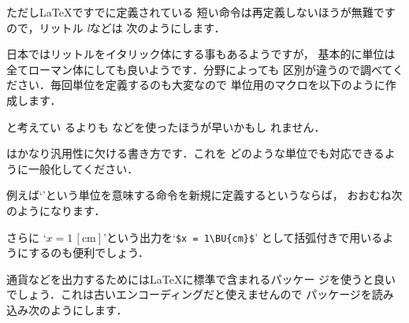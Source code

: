 \begin{InTeX}
\newcommand{\mm}{\ensuremath{\,\mathrm{mm}}}
\end{InTeX}

ただし{\LaTeX}ですでに定義されている
短い命令は再定義しないほうが無難ですので，リットル \textit{l}などは
次のようにします．

\begin{InTeX}
\newcommand{\litter}{\,\ensuremath{\mathit{l}}}
\end{InTeX}

日本ではリットルをイタリック体にする事もあるようですが，
基本的に単位は全てローマン体にしても良いようです．分野によっても
区別が違うので調べてください．毎回単位を定義するのも大変なので
単位用のマクロを以下のように作成します．

\begin{InTeX}
\newcommand{\mm}{\ensuremath{\,\mathrm{\milli mm}}}
\newcommand{\cm}{\ensuremath{\,\mathrm{cm}}}
\newcommand{\Km}{\ensuremath{\,\mathrm{Km}}}
\newcommand{\mg}{\ensuremath{\,\mathrm{mg}}}
\newcommand{\Kg}{\ensuremath{\,\mathrm{Kg}}}
\newcommand{\cc}{\ensuremath{\,\mathrm{cc}}}
\newcommand{\litter}{\,\ensuremath{l}}
\newcommand{\Ohm}{\ensuremath{\,\mathrm{\Omega}}}
\end{InTeX}

と考えてい
るよりも などを使ったほうが早いかもし
れません．

\begin{Prob}
はかなり汎用性に欠ける書き方です．これを
どのような単位でも対応できるように一般化してください．

例えば`'という単位を意味する命令を新規に定義するというならば，
おおむね次のようになります．

\begin{InTeX}
\newcommand*\U[1]{\ensuremath{\,\mathrm{#1}}}
\newcommand*\BU[1]{\ensuremath{\,[\mathrm{#1}]}}
\end{InTeX}

さらに `$x = 1\,[\mathrm{cm}]$'という出力を`\verb|$x = 1\BU{cm}$|'
として括弧付きで用いるようにするのも便利でしょう．
\end{Prob}

通貨などを出力するためには{\LaTeX}に標準で含まれるパッケー
ジを使うと良いでしょう．これは古いエンコーディングだと使えませんので
パッケージを読み込み次のようにします．

\begin{InTeX}
\usepackage[T1]{fontenc}
\usepackage{textcomp}
\end{InTeX}

